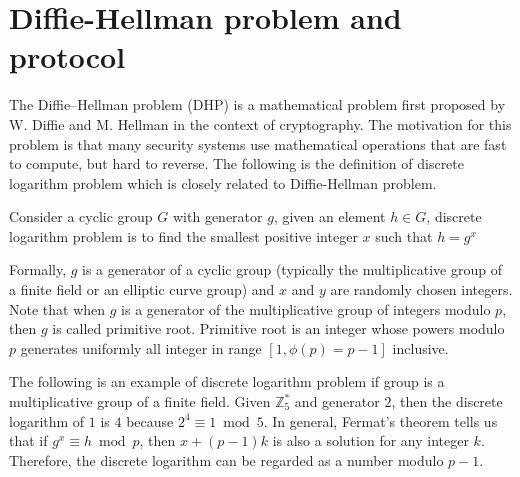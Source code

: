 \section{Diffie-Hellman problem and protocol}
The Diffie–Hellman problem (DHP) is a mathematical problem first proposed by W. Diffie and M. Hellman in the context of cryptography. The motivation for this problem is that many security systems use mathematical operations that are fast to compute, but hard to reverse. The following is the definition of discrete logarithm problem which is closely related to Diffie-Hellman problem.


\begin{definition}
\normalfont
Consider a cyclic group $G$ with generator $g$, given an element $h \in G$, discrete logarithm problem is to find the smallest positive integer $x$ such that $h = g^x$
\end{definition}




Formally, $g$ is a generator of a cyclic group (typically the multiplicative group of a finite field or an elliptic curve group) and $x$ and $y$ are randomly chosen integers. Note that when $g$ is a generator of the multiplicative group of integers modulo $p$, then $g$ is called primitive root. Primitive root is an integer whose powers modulo $p$ generates uniformly all integer in range $[1, \phi(p) = p - 1]$ inclusive.

The following is an example of discrete logarithm problem if group is a multiplicative group of a finite field. Given $\mathbb{Z}_5^*$ and generator $2$, then the discrete logarithm of $1$ is $4$ because $2^4 \equiv 1 \bmod 5$. In general, Fermat's theorem tells us that if $g^x \equiv h \bmod p$, then $x + (p - 1)k$ is also a solution for any integer $k$. Therefore, the discrete logarithm can be regarded as a number modulo $p - 1$.







